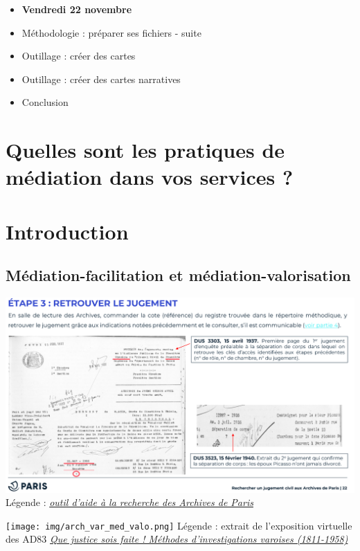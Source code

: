 \documentclass[
  letterpaper,
  DIV=11,
  numbers=noendperiod]{scrartcl}
\begin{document}
\begin{itemize}
\item
  \textbf{Vendredi 22 novembre}
\item
  Méthodologie : préparer ses fichiers - suite
\item
  Outillage : créer des cartes
\item
  Outillage : créer des cartes narratives
\item
  Conclusion
\end{itemize}

\section{Quelles sont les pratiques de médiation dans vos services
?}\label{quelles-sont-les-pratiques-de-muxe9diation-dans-vos-services}

\section{Introduction}\label{introduction}

\subsection{Médiation-facilitation et
médiation-valorisation}\label{muxe9diation-facilitation-et-muxe9diation-valorisation}

\includegraphics{img/arch_paris_med_facilitation.png} Légende :
\href{https://archives.paris.fr/_depot_ad75/_depot_arko/articles/2622/fiche-d-aide-a-la-recherche-jugement-civil_doc.pdf}{\emph{outil
d'aide à la recherche des Archives de Paris}}

\texttt{[image: img/arch\_var\_med\_valo.png]} Légende : extrait de
l'exposition virtuelle des AD83
\href{https://archives.var.fr/article.php?larub=308&titre=que-justice-soit-faite-methodes-d-investigations-varoises-1811-1958-}{\emph{Que
justice sois faite ! Méthodes d'investigations varoises (1811-1958)}}
\end{document}
